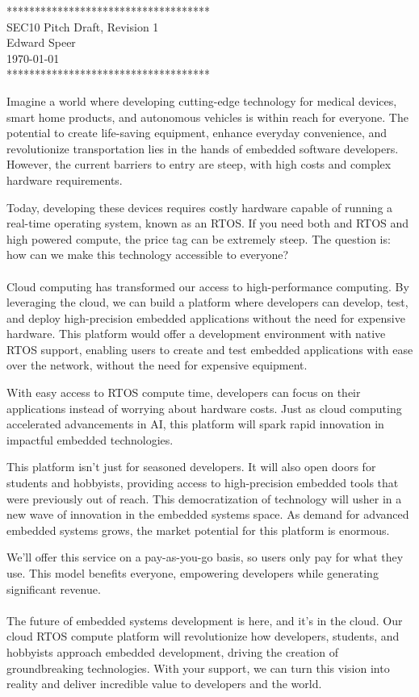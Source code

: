 \documentclass{article}
\newcommand{\HWNUM}{1}
\begin{document}

    \begin{center}
        ************************************ \\
        SEC10 Pitch Draft, Revision \HWNUM \\
        Edward Speer \\
        \today \\
        ************************************
    \end{center}

Imagine a world where developing cutting-edge technology for medical
devices, smart home products, and autonomous vehicles is within reach for
everyone. The potential to create life-saving equipment, enhance everyday
convenience, and revolutionize transportation lies in the hands of embedded
software developers. However, the current barriers to entry are steep, with
high costs and complex hardware requirements.

Today, developing these devices requires costly hardware capable of running
a real-time operating system, known as an RTOS. If you need both and RTOS and
high powered compute, the price tag can be extremely steep. The question is: how
can we make this technology accessible to everyone? \\ \hfill \\

Cloud computing has transformed our access to high-performance computing. By
leveraging the cloud, we can build a platform where developers can develop,
test, and deploy high-precision embedded applications without the need for
expensive hardware. This platform would offer a development environment with
native RTOS support, enabling users to create and test embedded applications
with ease over the network, without the need for expensive equipment.

With easy access to RTOS compute time, developers can focus on their
applications instead of worrying about hardware costs. Just as cloud computing
accelerated advancements in AI, this platform will spark rapid innovation in
impactful embedded technologies.

This platform isn't just for seasoned developers. It will also open doors for
students and hobbyists, providing access to high-precision embedded tools that
were previously out of reach. This democratization of technology will usher in a
new wave of innovation in the embedded systems space. As demand for advanced
embedded systems grows, the market potential for this platform is enormous.

We'll offer this service on a pay-as-you-go basis, so users only pay for what
they use. This model benefits everyone, empowering developers while generating
significant revenue. \\ \hfill \\

The future of embedded systems development is here, and it's in the cloud.
Our cloud RTOS compute platform will revolutionize how developers,
students, and hobbyists approach embedded development, driving the
creation of groundbreaking technologies. With your support, we can turn this
vision into reality and deliver incredible value to developers and the world.
\end{document}

